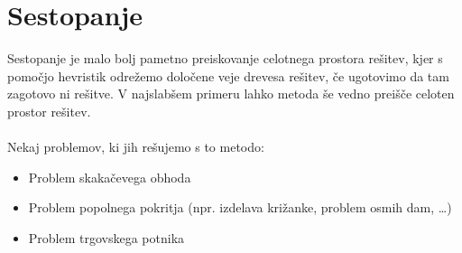 \documentclass[10pt,a4paper,oneside]{book}
\newenvironment{items}{
\begin{itemize}
  \setlength{\itemsep}{1pt}
  \setlength{\parskip}{0pt}
  \setlength{\parsep}{0pt}
}{\end{itemize}}
\begin{document}
\section{Sestopanje}
Sestopanje je malo bolj pametno preiskovanje celotnega prostora rešitev, kjer s pomočjo hevristik odrežemo določene veje drevesa rešitev, če ugotovimo da tam zagotovo ni rešitve. V najslabšem primeru lahko metoda še vedno preišče celoten prostor rešitev.\\
 \\
Nekaj problemov, ki jih rešujemo s to metodo:
\begin{items}
	\item Problem skakačevega obhoda
	\item Problem popolnega pokritja (npr. izdelava križanke, problem osmih dam, \dots)
	\item Problem trgovskega potnika
\end{items}
\end{document}
